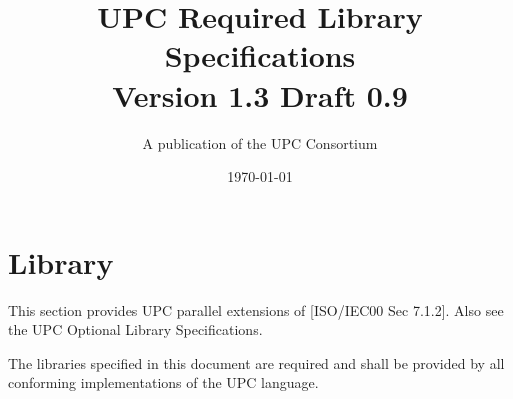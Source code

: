 \newcommand{\myversion}{Version 1.3 Draft 0.9}
\newcommand{\mytitle}{UPC Required Library Specifications}


\makeindex

\title{\mytitle\\
\myversion}

\author{A publication of the UPC Consortium}

\date{\today
\draftnote}



\maketitle

\setcounter{page}{2}

\dotoc

\setcounter{section}{6} %
\section{Library}

\npf This section provides UPC parallel extensions of [ISO/IEC00 Sec 7.1.2]. Also see the UPC Optional Library Specifications.

\np The libraries specified in this document are required and shall be provided by all conforming implementations of the UPC language.

\setcounter{subsection}{2} %



\doindex


